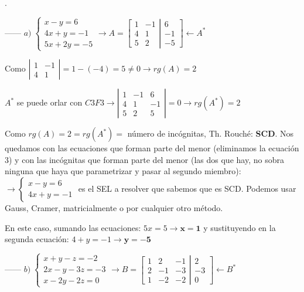 \begin{proofw}\renewcommand{\qedsymbol}{$\diamond$}.


------ $a) \; \begin{cases} x-y=6\\4x+y=-1\\5x+2y=-5  \end{cases} \to A=\left[ \begin{matrix}   
 \boxed{1}& \boxed{-1}\\ \boxed{4}& \boxed{1}\\5&2	 \end{matrix} \right| \left. \begin{matrix} 
6\\-1\\-5	
 \end{matrix} \right] \leftarrow A^*$
 
 Como $\left| \begin{matrix} 1&-1\\4&1 \end{matrix} \right|=1-(-4)=5\neq 0 \to rg(A)=2$
 
 $A^*$ se puede orlar con $C3F3 \to \left| \begin{matrix} 1&-1&6\\4&1&-1\\5&2&5 \end{matrix} \right|=0 \to rg(A^*)=2 $
 
 Como $rg(A)=2=rg(A^*)=$ número de incógnitas, Th. Rouché: \textbf{SCD}. Nos quedamos con las ecuaciones que forman parte del menor (eliminamos la ecuación $3$) y con las incógnitas que forman parte del menor (las dos que hay, no sobra ninguna que haya que parametrizar y pasar al segundo miembro): $\to \begin{cases} x-y=6\\4x+y=-1 \end{cases}$ es el SEL a resolver que sabemos que es SCD. Podemos usar Gauss, Cramer, matricialmente o por cualquier otro método.
 
 En este caso, sumando las ecuaciones: $	 5x=5 \to \boldsymbol{x=1}$ y sustituyendo en la segunda ecuación: $4+y=-1 \to \boldsymbol{y=-5}$






------ $b)\; \begin{cases} x+y-z=-2\\2x-y-3z=-3\\x-2y-2z=0  \end{cases}  \to B=\left[ \begin{matrix}   
1&2&-1\\2&-1&-3\\1&-2&-2   \end{matrix} \right| \left. \begin{matrix} 
2\\-3\\0  	
 \end{matrix} \right] \leftarrow B^*$
 

\end{proofw}
